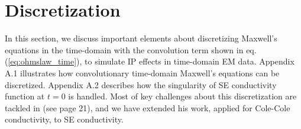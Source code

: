 \newcommand{\vol}{\mathbf{v}}
\newcommand{\I}{\vec{I}}
\newcommand{\A}{\mathbf{A}}
\newcommand{\bI}{\mathbf{I}}
\newcommand{\bus}{\mathbf{u}^s}
\newcommand{\brhss}{\mathbf{rhs}_s}
\newcommand{\bup}{\mathbf{u}^p}
\newcommand{\brhs}{\mathbf{rhs}}
\newcommand{\bon}{b^{on}(t)}
\newcommand{\bp}{b^{p}}
\newcommand{\dbondt}{\frac{db^{on}(t)}{dt}}
\newcommand{\dfdt}{\frac{df(t)}{dt}}
\newcommand{\dfdtdsiginf}{\frac{\partial\frac{df(t)}{dt}}{\partial\siginf}}
\newcommand{\dfdsiginf}{\frac{\partial f(t)}{\partial\siginf}}
\newcommand{\dbgdsiginf}{\frac{\partial b^{Impulse}(t)}{\partial\siginf}}
\newcommand{\digint}{\frac{2}{\pi}\int_0^{\infty}}
\newcommand{\Gbiot}{\mathbf{G}_{Biot}}
\newcommand{\peta}{\tilde{\eta}}
\newcommand{\eFmax}{\e^{\ F}_{max}}
\newcommand{\eref}{\e^{\ ref}}
\newcommand{\jref}{\j^{\ ref}}
\newcommand{\dip}{d^{IP}}
\newcommand{\sigpert}{\delta\sigma}
\newcommand{\bzip}{b_z^{IP}}
\newcommand{\dbzdtip}{\frac{\partial b_z^{IP}}{\partial t}}
\newcommand{\boldeta}{\boldsymbol{\eta}}
\newcommand{\boldtau}{\boldsymbol{\tau}}
\newcommand{\boldc}{\boldsymbol{c}}
\newcommand{\boldsiginf}{\boldsymbol{\sigma}_{\infty}}
\newcommand{\boldpeta}{\boldsymbol{\peta}}

\section{Discretization}
\label{app: Discretization}
In this section, we discuss important elements about discretizing Maxwell’s equations in the time-domain with the convolution term shown in eq. (\ref{eq:ohmslaw_time}), to simulate IP effects in time-domain EM data. Appendix A.1 illustrates how convolutionary time-domain Maxwell's equations can be discretized.  Appendix A.2 describes how the singularity of SE conductivity function at $t=0$ is handled. Most of key challenges about this discretization are tackled in \cite{marchant2015} (see page 21), and we have extended his work, applied for Cole-Cole conductivity, to SE conductivity.

